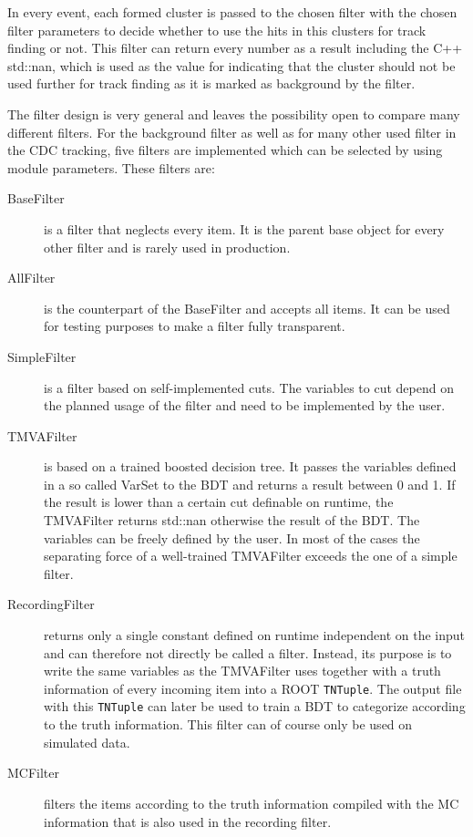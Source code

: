 In every event, each formed cluster is passed to the chosen filter with the chosen filter parameters to decide whether to use the hits in this clusters for track finding or not. This filter can return every number as a result including the C++ std::nan, which is used as the value for indicating that the cluster should not be used further for track finding as it is marked as background by the filter.

The filter design is very general and leaves the possibility open to compare many different filters. For the background filter as well as for many other used filter in the CDC tracking, five filters are implemented which can be selected by using module parameters. These filters are:

\begin{description}
  \item[BaseFilter] is a filter that neglects every item. It is the parent base object for every other filter and is rarely used in production.
  \item[AllFilter] is the counterpart of the BaseFilter and accepts all items. It can be used for testing purposes to make a filter fully transparent.
  \item[SimpleFilter] is a filter based on self-implemented cuts. The variables to cut depend on the planned usage of the filter and need to be implemented by the user.
  \item[TMVAFilter] is based on a trained boosted decision tree. It passes the variables defined in a so called VarSet to the BDT and returns a result between 0 and 1. If the result is lower than a certain cut definable on runtime, the TMVAFilter returns std::nan otherwise the result of the BDT. The variables can be freely defined by the user. In most of the cases the separating force of a well-trained TMVAFilter exceeds the one of a simple filter.
  \item[RecordingFilter] returns only a single constant defined on runtime independent on the input and can therefore not directly be called a filter. Instead, its purpose is to write the same variables as the TMVAFilter uses together with a truth information of every incoming item into a ROOT \texttt{TNTuple}. The output file with this \texttt{TNTuple} can later be used to train a BDT to categorize according to the truth information. This filter can of course only be used on simulated data.
  \item[MCFilter] filters the items according to the truth information compiled with the MC information that is also used in the recording filter.
\end{description}

